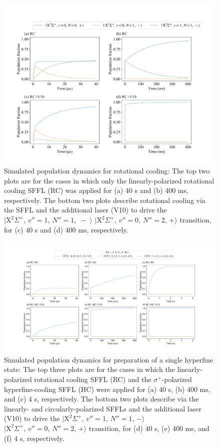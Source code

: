 \documentclass[twoside,twocolumn,9pt]{article}
\begin{document}
\begin{figure}[htbp!]
  \centering
  \includegraphics[width=11cm]{RC_RCV10}
  \caption
  {Simulated population dynamics for rotational cooling: The top two plots are for the cases in which only the linearly-polarized rotational cooling SFFL (RC) was applied for (a) 40 \si{\micro}s and (b) 400 ms, respectively. The bottom two plots describe rotational cooling via the SFFL and the additional laser (V10) to drive the $\lvert \mathrm{X}^2\Sigma^+,\, v''=1,\, N''=1,\; - \;\rangle$ \pp{--} $\lvert \mathrm{X}^2\Sigma^+,\, v''=0,\, N''=2,\, +\rangle$ transition, for (c) 40 \si{\micro}s and (d) 400 ms, respectively.
  }\label{RC_RCV10}
\end{figure}

\begin{figure}[htbp!]
  \centering
  \includegraphics[width=16.5cm]{RCHC_RCHCV10}
  \caption
  {Simulated population dynamics for preparation of a single hyperfine state: The top three plots are for the cases in which the linearly-polarized rotational cooling SFFL (RC) and the $\sigma^+$-polarized hyperfine-cooling SFFL (HC) were applied for (a) 40 \si{\micro}s, (b) 400 ms, and (c) 4 s, respectively. The bottom two plots describe  via the linearly- and circularly-polarized SFFLs and the additional laser (V10) to drive the $\lvert \mathrm{X}^2\Sigma^+,\, v''=1,\, N''=1,\, -\rangle$ \pp{--} $\lvert \mathrm{X}^2\Sigma^+,\, v''=0,\, N''=2,\, +\rangle$ transition, for (d) 40 \si{\micro}s, (e) 400 ms, and (f) 4 s, respectively.
}\label{RCHC_RCHCV10}
\end{figure}
\end{document}
